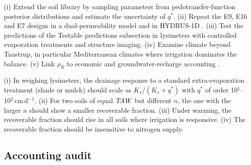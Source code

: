 (i) Extend the soil library by sampling parameters from pedotransfer-function posterior distributions and estimate the uncertainty of $q^\ast$. (ii) Repeat the E9, E16 and E7 designs in a dual-permeability model and in HYDRUS-1D \citep{Simunek2008}. (iii) Test the predictions of the Testable predictions subsection in lysimeters with controlled evaporation treatments and structure imaging. (iv) Examine climate beyond Taastrup, in particular Mediterranean climates where irrigation dominates the balance. (v) Link $\rho_R$ to economic and groundwater-recharge accounting \citep{Ward2008,Grafton2018}.

(i) In weighing lysimeters, the drainage response to a standard extra-evaporation treatment (shade or mulch) should scale as $K_s/(K_s+q^\ast)$ with $q^\ast$ of order 10$^1$--10$^2$\,cm\,d$^{-1}$. (ii) For two soils of equal $\mathit{TAW}$ but different $n$, the one with the larger $n$ should show a smaller recoverable fraction. (iii) Under warming, the recoverable fraction should rise in all soils where irrigation is responsive. (iv) The recoverable fraction should be insensitive to nitrogen supply.

\subsection{Accounting audit}
\label{sec:discB}
